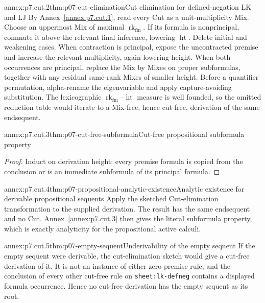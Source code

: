 \begin{annexitem}{annex:p7.cut.2}{thm:p07-cut-elimination}{Cut elimination for defined-negation LK and LJ}
By Annex~\ref{annex:p7.cut.1}, read every Cut as a unit-multiplicity Mix.
Choose an uppermost Mix of maximal
\(\operatorname{rk}_{\mathrm{fm}}\).  If its formula is nonprincipal,
commute it above the relevant final inference, lowering
\(\operatorname{ht}\).
Delete initial and weakening cases.  When contraction is principal, expose
the uncontracted premise and increase the relevant multiplicity, again
lowering height.  When both occurrences are principal, replace the Mix by
Mixes on proper subformulas, together with any residual same-rank Mixes of
smaller height.  Before a quantifier permutation, alpha-rename the
eigenvariable and apply capture-avoiding substitution.  The lexicographic
\(\operatorname{rk}_{\mathrm{fm}}\)--\(\operatorname{ht}\) measure is well
founded, so the omitted reduction table would
iterate to a Mix-free, hence cut-free, derivation of the same endsequent.
\end{annexitem}

\begin{annexitem}{annex:p7.cut.3}{thm:p07-cut-free-subformula}{Cut-free propositional subformula property}
\begin{proof}
Induct on derivation height: every premise formula is copied from the
conclusion or is an immediate subformula of its principal formula.
\end{proof}
\end{annexitem}

\begin{annexitem}{annex:p7.cut.4}{thm:p07-propositional-analytic-existence}{Analytic existence for derivable propositional sequents}
Apply the sketched Cut-elimination transformation to the supplied derivation.
The result has the same endsequent and no Cut.  Annex~\ref{annex:p7.cut.3}
then gives the literal subformula property, which is exactly analyticity for
the propositional active calculi.
\end{annexitem}

\begin{annexitem}{annex:p7.cut.5}{thm:p07-empty-sequent}{Underivability of the empty sequent}
If the empty sequent were derivable, the cut-elimination sketch would give a
cut-free derivation of it.  It is not an instance of either zero-premise rule,
and the conclusion of every other cut-free rule on
\texttt{sheet:lk-defneg} contains a displayed formula occurrence.  Hence no
cut-free derivation has the empty sequent as its root.
\end{annexitem}
